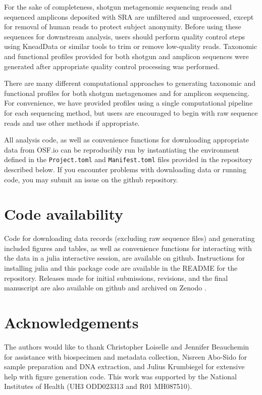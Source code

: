 \documentclass[fleqn,10pt]{wlscirep}
\begin{document}
For the sake of completeness, shotgun metagenomic sequencing reads and sequenced amplicons deposited with SRA
are unfiltered and unprocessed, except for removal of human reads to protect subject anonymity.
Before using these sequences for downstream analysis, users should perform quality control steps
using KneadData or similar tools to trim or remove low-quality reads.
Taxonomic and functional profiles provided for both shotgun and amplicon sequences
were generated after appropriate quality control processing was performed. 

There are many different computational approaches to generating taxonomic and functional profiles
for both shotgun metagenomes and for amplicon sequencing.
For convenience, we have provided profiles using a single computational pipeline for each sequencing method,
but users are encouraged to begin with raw sequence reads and use other methods if appropriate.

All analysis code, as well as convenience functions for downloading appropriate data from OSF.io
can be reproducibly run by instantiating the environment defined in the \verb|Project.toml| and \verb|Manifest.toml| files
provided in the repository described below.
If you encounter problems with downloading data or running code, you may submit an issue on the github repository.

\section*{Code availability}

Code for downloading data records (excluding raw sequence files) and generating included figures and tables,
as well as convenience functions for interacting with the data in a julia interactive session,
are available on github.
Instructions for installing julia and this package code are available in the README for the repository.
Releases made for initial submissions, revisions, and the final manuscript
are also available on github and archived on Zenodo \cite{Bonham2021-gl}.



\section*{Acknowledgements}

The authors would like to thank Christopher Loiselle and Jennifer Beauchemin
for assistance with biospecimen and metadata collection,
Nisreen Abo-Sido for sample preparation and DNA extraction,
and Julius Krumbiegel for extensive help with figure generation code. 
This work was supported by the National Institutes of Health (UH3 ODD023313 and R01 MH087510). 
\end{document}
